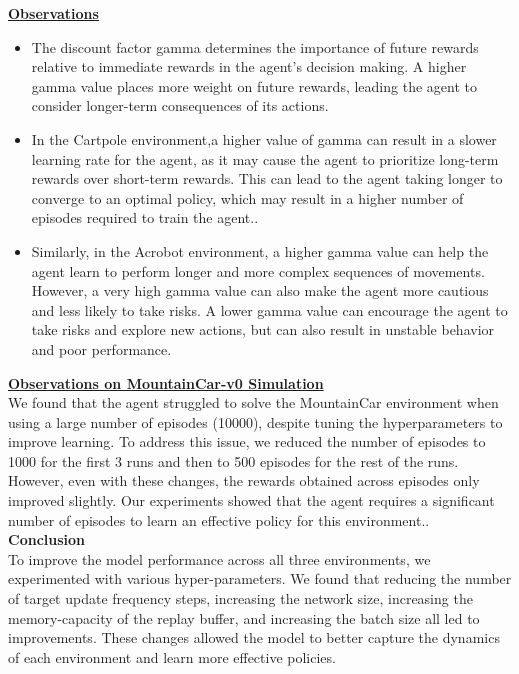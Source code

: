 \documentclass{article}
\begin{document}
\begin{itemize}
        \textbf{\underline{Observations}}
        \begin{itemize}
            \item The discount factor gamma determines the importance of future rewards relative to immediate rewards in the agent's decision making. A higher gamma value places more weight on future rewards, leading the agent to consider longer-term consequences of its actions.
            \item In the Cartpole environment,a higher value of gamma can result in a slower learning rate for the agent, as it may cause the agent to prioritize long-term rewards over short-term rewards. This can lead to the agent taking longer to converge to an optimal policy, which may result in a higher number of episodes required to train the agent..
            \item Similarly, in the Acrobot environment, a higher gamma value can help the agent learn to perform longer and more complex sequences of movements. However, a very high gamma value can also make the agent more cautious and less likely to take risks. A lower gamma value can encourage the agent to take risks and explore new actions, but can also result in unstable behavior and poor performance.
        \end{itemize}

        \textbf{\underline{Observations on MountainCar-v0 Simulation}}\\

        We found that the agent struggled to solve the MountainCar environment when using a large number of episodes (10000), despite tuning the hyperparameters to improve learning. To address this issue, we reduced the number of episodes to 1000 for the first 3 runs and then to 500 episodes for the rest of the runs. However, even with these changes, the rewards obtained across episodes only improved slightly. Our experiments showed that the agent requires a significant number of episodes to learn an effective policy for this environment..\\

        \textbf{\large{Conclusion}}\\

        To improve the model performance across all three environments, we experimented with various hyper-parameters. We found that reducing the number of target update frequency steps, increasing the network size, increasing the memory-capacity of the replay buffer, and increasing the batch size all led to improvements. These changes allowed the model to better capture the dynamics of each environment and learn more effective policies.

    \end{itemize}
\end{document}
